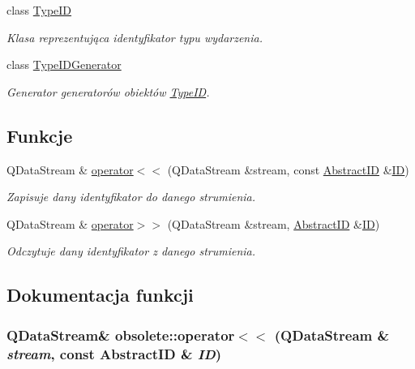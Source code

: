 \begin{DoxyCompactItemize}
class \hyperlink{classobsolete_1_1TypeID}{TypeID}
\begin{DoxyCompactList}\small\item\em Klasa reprezentująca identyfikator typu wydarzenia. \item\end{DoxyCompactList}\item 
class \hyperlink{classobsolete_1_1TypeIDGenerator}{TypeIDGenerator}
\begin{DoxyCompactList}\small\item\em Generator generatorów obiektów \hyperlink{classobsolete_1_1TypeID}{TypeID}. \item\end{DoxyCompactList}\end{DoxyCompactItemize}
\subsection*{Funkcje}
\begin{DoxyCompactItemize}
\item 
QDataStream \& \hyperlink{namespaceobsolete_ae67d47b6a22388897d176c4569da81d2}{operator$<$$<$} (QDataStream \&stream, const \hyperlink{classobsolete_1_1AbstractID}{AbstractID} \&\hyperlink{classobsolete_1_1ID}{ID})
\begin{DoxyCompactList}\small\item\em Zapisuje dany identyfikator do danego strumienia. \item\end{DoxyCompactList}\item 
QDataStream \& \hyperlink{namespaceobsolete_aa4c713ba2a42ffbb45bbeca0e2800a76}{operator$>$$>$} (QDataStream \&stream, \hyperlink{classobsolete_1_1AbstractID}{AbstractID} \&\hyperlink{classobsolete_1_1ID}{ID})
\begin{DoxyCompactList}\small\item\em Odczytuje dany identyfikator z danego strumienia. \item\end{DoxyCompactList}\end{DoxyCompactItemize}


\subsection{Dokumentacja funkcji}
\hypertarget{namespaceobsolete_ae67d47b6a22388897d176c4569da81d2}{
\subsubsection[{operator$<$$<$}]{\setlength{\rightskip}{0pt plus 5cm}QDataStream\& obsolete::operator$<$$<$ (QDataStream \& {\em stream}, \/  const AbstractID \& {\em ID})}}
\label{namespaceobsolete_ae67d47b6a22388897d176c4569da81d2}


